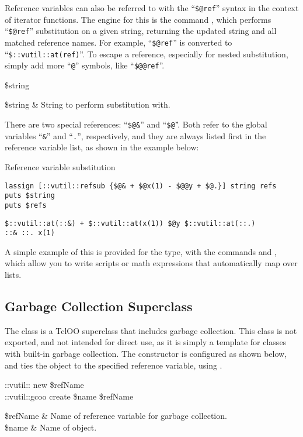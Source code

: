 \documentclass{article}
\begin{document}
Reference variables can also be referred to with the ``\texttt{\$@ref}'' syntax in the context of iterator functions. 
The engine for this is the command , which performs ``\texttt{\$@ref}'' substitution on a given string, returning the updated string and all matched reference names. 
For example, ``\texttt{\$@ref}'' is converted to ``\texttt{\$::vutil::at(ref)}''.
To escape a reference, especially for nested substitution, simply add more ``\texttt{@}'' symbols, like ``\texttt{\$@@ref}''.
\begin{syntax}
 \$string
\end{syntax}
\begin{args}
\$string & String to perform substitution with.
\end{args}

There are two special references: ``\texttt{\$@\&}'' and ``\texttt{\$@\.}''. Both refer to the global variables ``\texttt{\&}'' and ``\texttt{.}'', respectively, and they are always listed first in the reference variable list, as shown in the example below:
\begin{example}{Reference variable substitution}
\begin{lstlisting}
lassign [::vutil::refsub {$@& + $@x(1) - $@@y + $@.}] string refs
puts $string
puts $refs
\end{lstlisting}
\tcblower
\begin{lstlisting}
$::vutil::at(::&) + $::vutil::at(x(1)) $@y $::vutil::at(::.) 
::& ::. x(1)
\end{lstlisting}
\end{example}
A simple example of this is provided for the  type, with the commands  and , which allow you to write scripts or math expressions that automatically map over lists.

\clearpage
\subsection{Garbage Collection Superclass}
The class  is a TclOO superclass that includes garbage collection. 
This class is not exported, and not intended for direct use, as it is simply a template for classes with built-in garbage collection.
The constructor is configured as shown below, and ties the object to the specified reference variable, using .
\begin{syntax}
::vutil:: new \$refName \\
::vutil::gcoo create \$name \$refName
\end{syntax}
\begin{args}
\$refName & Name of reference variable for garbage collection. \\
\$name & Name of object.
\end{args}
\end{document}
